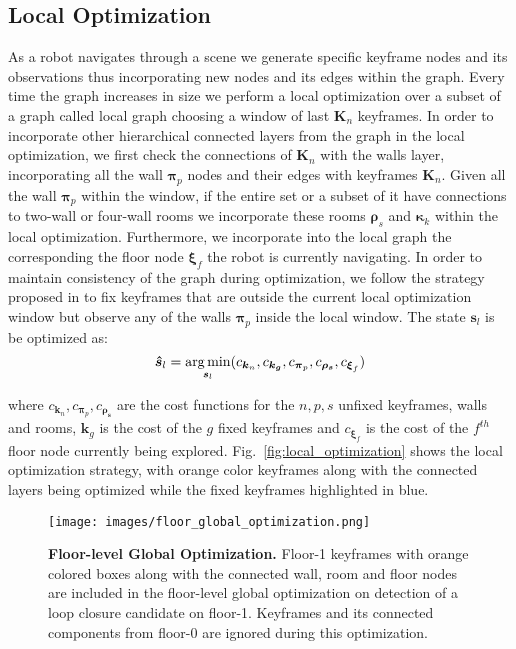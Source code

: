 \subsection{Local Optimization}
As a robot navigates through a scene we generate specific keyframe nodes and its observations thus incorporating new nodes and its edges within the graph. Every time the graph increases in size we perform a local optimization over a subset of a graph called local graph choosing a window of last $\boldsymbol{K}_n$ keyframes. In order to incorporate other hierarchical connected layers from the graph in the local optimization, we first check the connections of $\boldsymbol{K}_n$ with the walls layer, incorporating all the wall $\boldsymbol{\pi}_p$ nodes and their edges with keyframes $\boldsymbol{K}_n$. Given all the wall $\boldsymbol{\pi}_p$ within the window, if the entire set or a subset of it have connections to two-wall or four-wall rooms we incorporate these rooms $\boldsymbol{\rho}_s$ and $\boldsymbol{\kappa}_k$ within the local optimization. Furthermore, we incorporate into the local graph the corresponding the floor node $\boldsymbol{\xi}_f$ the robot is currently navigating. In order to maintain consistency of the graph during optimization, we follow the strategy proposed in \cite{orb_slam3} to fix keyframes that are outside the current local optimization window but observe any of the walls $\boldsymbol{\pi}_p$ inside the local window. The state $\boldsymbol{s}_l$ is be optimized as: 
%
\begin{equation}
    \boldsymbol{\hat{s}}_l = \operatorname*{arg\,min}_{\boldsymbol{s}_l} (c_{\boldsymbol{k}_n}, c_{\boldsymbol{k_g}}, c_{\boldsymbol{\pi}_p}, c_{\boldsymbol{\rho_s}}, c_{\boldsymbol{\xi}_f})
\end{equation}

where $c_{\boldsymbol{k}_n}, c_{\boldsymbol{\pi}_p}, c_{\boldsymbol{\rho_s}}$ are the cost functions for the $n, p, s$  unfixed keyframes, walls and rooms, ${\boldsymbol{k}_g}$ is the cost of the $g$ fixed keyframes and $ c_{\boldsymbol{\xi}_f}$ is the cost of the $f^{th}$ floor node currently being explored. 
Fig.~\ref{fig:local_optimization} shows the local optimization strategy, with orange color keyframes along with the connected layers being optimized while the fixed keyframes highlighted in blue. 

\begin{figure}[t]
  \centering
  \texttt{[image: images/floor\_global\_optimization.png]}
  \caption{\textbf{Floor-level Global Optimization.} Floor-1 keyframes with orange colored boxes along with the connected wall, room and floor nodes are included in the floor-level global optimization on detection of a loop closure candidate on floor-1. Keyframes and its connected components from floor-0 are ignored during this optimization.}
  \label{fig:floor_global_optimization}
\end{figure}


